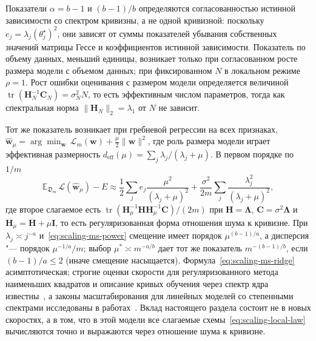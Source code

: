 \begin{remark}
    \label{rem:scaling-ms-curvature}
    Показатели $\alpha = b - 1$ и $(b-1)/b$ определяются согласованностью истинной зависимости со спектром кривизны, а не одной кривизной: поскольку $e_j = \lambda_j(\theta_j^\star)^2$, они зависят от суммы показателей убывания собственных значений матрицы Гессе и коэффициентов истинной зависимости. Показатель по объему данных, меньший единицы, возникает только при согласованном росте размера модели с объемом данных; при фиксированном $N$ в локальном режиме $\rho = 1$. Рост ошибки оценивания с размером модели определяется величиной $\operatorname{tr}(\mathbf H_N^{-1}\mathbf C_N) = \sigma_N^2 N$, то есть эффективным числом параметров, тогда как спектральная норма $\|\mathbf H_N\|_2 = \lambda_1$ от $N$ не зависит.
\end{remark}

Тот же показатель возникает при гребневой регрессии на всех признаках, $\hat{\mathbf w}_\mu = \arg\min_{\mathbf w}\, \mathcal L_m(\mathbf w) + \frac{\mu}{2}\|\mathbf w\|^2$, где роль размера модели играет эффективная размерность $d_{\mathrm{eff}}(\mu) = \sum_j \lambda_j/(\lambda_j + \mu)$. В первом порядке по $1/m$
\begin{equation}
    \label{eq:scaling-ms-ridge}
    \mathbb E_{\mathfrak D_m}\,\mathcal L(\hat{\mathbf w}_\mu) - E
    \approx
    \frac12 \sum_j e_j \frac{\mu^2}{(\lambda_j + \mu)^2}
    +
    \frac{\sigma^2}{2m} \sum_j \frac{\lambda_j^2}{(\lambda_j + \mu)^2},
\end{equation}
где второе слагаемое есть $\operatorname{tr}(\mathbf H_\mu^{-1}\mathbf H\mathbf H_\mu^{-1}\mathbf C)/(2m)$ при $\mathbf H = \boldsymbol\Lambda$, $\mathbf C = \sigma^2\boldsymbol\Lambda$ и $\mathbf H_\mu = \mathbf H + \mu\mathbf I$, то есть регуляризованная форма отношения шума к кривизне. При $\lambda_j \asymp j^{-a}$ и~\eqref{eq:scaling-ms-power} смещение имеет порядок $\mu^{(b-1)/a}$, а дисперсия "--- порядок $\mu^{-1/a}/m$; выбор $\mu^* \asymp m^{-a/b}$ дает тот же показатель $m^{-(b-1)/b}$, если $(b-1)/a \leqslant 2$ (иначе смещение насыщается). Формула~\eqref{eq:scaling-ms-ridge} асимптотическая; строгие оценки скорости для регуляризованного метода наименьших квадратов и описание кривых обучения через спектр ядра известны~\cite{caponnetto2007optimal,bordelon2020spectrum}, а законы масштабирования для линейных моделей со степенными спектрами исследованы в работах~\cite{bordelon2024dynamical,lin2024scaling}. Вклад настоящего раздела состоит не в новых скоростях, а в том, что в этой модели все слагаемые схемы~\eqref{eq:scaling-local-law} вычисляются точно и выражаются через отношение шума к кривизне.


